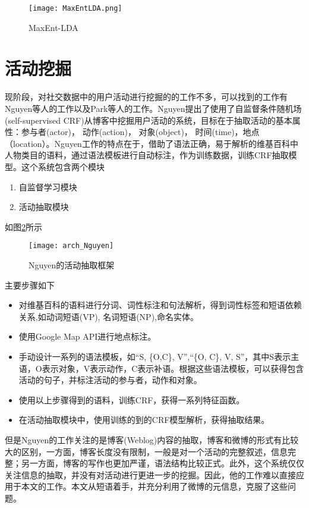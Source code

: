 \begin{figure}[!h]
\centering
\texttt{[image: MaxEntLDA.png]}
\caption{MaxEnt-LDA}
\label{fig:maxent_lda}
\end{figure}

\section{活动挖掘}
现阶段，对社交数据中的用户活动进行挖掘的的工作不多，可以找到的工作有Nguyen等人的工作以及Park等人的工作。Nguyen\cite{the2010automatic}\cite{kawamura2010human}提出了使用了自监督条件随机场(self-supervised CRF)从博客中挖掘用户活动的系统，目标在于抽取活动的基本属性：参与者(actor)， 动作(action)， 对象(object)， 时间(time)，地点（location）。Nguyen工作的特点在于，借助了语法正确，易于解析的维基百科中人物类目的语料，通过语法模板进行自动标注，作为训练数据，训练CRF抽取模型。这个系统包含两个模块
\begin{enumerate}
\item 自监督学习模块
\item 活动抽取模块
\end{enumerate}
如图\ref{fig:nguyen_frameword}所示
\begin{figure}[!h]
\centering
\texttt{[image: arch\_Nguyen]}
\caption{Nguyen的活动抽取框架}
\label{fig:nguyen_frameword}
\end{figure}

主要步骤如下
\begin{itemize}
\item 对维基百科的语料进行分词、词性标注和句法解析，得到词性标签和短语依赖关系,如动词短语(VP), 名词短语(NP),命名实体。
\item 使用Google Map API进行地点标注。
\item 手动设计一系列的语法模板，如``S, \{O,C\}, V'',``\{O, C\}, V, S''，其中S表示主语，O表示对象，V表示动作，C表示补语。根据这些语法模板，可以获得包含活动的句子，并标注活动的参与者，动作和对象。
\item 使用以上步骤得到的语料，训练CRF，获得一系列特征函数。
\item 在活动抽取模块中，使用训练的到的CRF模型解析，获得抽取结果。
\end{itemize}

但是Nguyen的工作关注的是博客(Weblog)内容的抽取，博客和微博的形式有比较大的区别，一方面，博客长度没有限制，一般是对一个活动的完整叙述，信息完整；另一方面，博客的写作也更加严谨，语法结构比较正式。此外，这个系统仅仅关注信息的抽取，并没有对活动进行更进一步的挖掘。因此，他的工作难以直接应用于本文的工作。本文从短语着手，并充分利用了微博的元信息，克服了这些问题。


